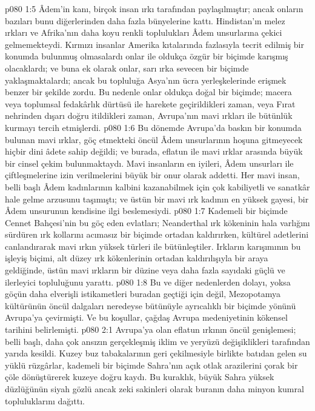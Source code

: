 \vs p080 1:5 Âdem’in kanı, birçok insan ırkı tarafından paylaşılmıştır; ancak onların bazıları bunu diğerlerinden daha fazla bünyelerine kattı. Hindistan’ın melez ırkları ve Afrika’nın daha koyu renkli toplulukları Âdem unsurlarına çekici gelmemekteydi. Kırmızı insanlar Amerika kıtalarında fazlasıyla tecrit edilmiş bir konumda bulunmuş olmasalardı onlar ile oldukça özgür bir biçimde karışmış olacaklardı; ve buna ek olarak onlar, sarı ırka sevecen bir biçimde yaklaşmaktalardı; ancak bu topluluğa Asya’nın ücra yerleşkelerinde erişmek benzer bir şekilde zordu. Bu nedenle onlar oldukça doğal bir biçimde; macera veya toplumsal fedakârlık dürtüsü ile harekete geçirildikleri zaman, veya Fırat nehrinden dışarı doğru itildikleri zaman, Avrupa’nın mavi ırkları ile bütünlük kurmayı tercih etmişlerdi.
\vs p080 1:6 Bu dönemde Avrupa’da baskın bir konumda bulunan mavi ırklar, göç etmekteki öncül Âdem unsurlarının hoşuna gitmeyecek hiçbir dini âdete sahip değildi; ve burada, eflatun ile mavi ırklar arasında büyük bir cinsel çekim bulunmaktaydı. Mavi insanların en iyileri, Âdem unsurları ile çiftleşmelerine izin verilmelerini büyük bir onur olarak addetti. Her mavi insan, belli başlı Âdem kadınlarının kalbini kazanabilmek için çok kabiliyetli ve sanatkâr hale gelme arzusunu taşımıştı; ve üstün bir mavi ırk kadının en yüksek gayesi, bir Âdem unsurunun kendisine ilgi beslemesiydi.
\vs p080 1:7 Kademeli bir biçimde Cennet Bahçesi’nin bu göç eden evlatları; Neanderthal ırk kökeninin hala varlığını sürdüren ırk kollarını acımasız bir biçimde ortadan kaldırırken, kültürel adetlerini canlandırarak mavi ırkın yüksek türleri ile bütünleştiler. Irkların karışımının bu işleyiş biçimi, alt düzey ırk kökenlerinin ortadan kaldırılışıyla bir araya geldiğinde, üstün mavi ırkların bir düzine veya daha fazla sayıdaki güçlü ve ilerleyici topluluğunu yarattı.
\vs p080 1:8 Bu ve diğer nedenlerden dolayı, yoksa göçün daha elverişli istikametleri buradan geçtiği için değil, Mezopotamya kültürünün öncül dalgaları neredeyse bütünüyle ayrıcalıklı bir biçimde yönünü Avrupa’ya çevirmişti. Ve bu koşullar, çağdaş Avrupa medeniyetinin kökensel tarihini belirlemişti.
\vs p080 2:1 Avrupa’ya olan eflatun ırkının öncül genişlemesi; belli başlı, daha çok ansızın gerçekleşmiş iklim ve yeryüzü değişiklikleri tarafından yarıda kesildi. Kuzey buz tabakalarının geri çekilmesiyle birlikte batıdan gelen su yüklü rüzgârlar, kademeli bir biçimde Sahra’nın açık otlak arazilerini çorak bir çöle dönüştürerek kuzeye doğru kaydı. Bu kuraklık, büyük Sahra yüksek düzlüğünün siyah gözlü ancak zeki sakinleri olarak buranın daha minyon kumral topluluklarını dağıttı.
